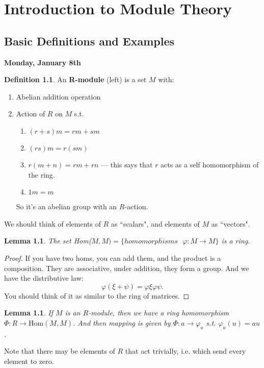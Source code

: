 \documentclass[12pt]{amsbook}
\theoremstyle{plain}
\numberwithin{section}{chapter}
\numberwithin{equation}{chapter}
\newtheorem{lem}[theorem]{Lemma}
\theoremstyle{definition}
\newtheorem{Def}[theorem]{Definition}
\theoremstyle{remark}
\renewcommand{\phi}{\varphi}
\begin{document}
\chapter{Introduction to Module Theory}
\section{Basic Definitions and Examples}

\textbf{Monday, January 8th}
\begin{Def}
An \textbf{R-module} (left) is a set $M$ with: 
\begin{enumerate}
\item Abelian addition operation
\item Action of $R$ on $M$ s.t. 
\begin{enumerate}
\item $(r + s)m = rm + sm$ 
\item $(rs)m = r(sm)$
\item $r(m + n) = rm + rn$ --- this says that $r$ acts as a self homomorphism of the ring. 
\item $1m = m$
\end{enumerate}
So it's an abelian group with an $R$-action. 
\end{enumerate}
\end{Def}

We should think of elements of $R$ as ``scalars", and elements of $M$ as ``vectors".

\begin{lem}
The set Hom($M,M) = \{homomorphisms \text{ } \phi:M \to M\}$ is a ring. 
\end{lem} 

\begin{proof}
If you have two homs, you can add them, and the product is a composition. They are associative, under addition, they form a group. And we have the distributive law: 
$$
\phi(\xi + \psi) = \phi\xi \phi\psi.
$$
You should think of it as similar to the ring of matrices. 
\end{proof}


\begin{lem}
If $M$ is an $R$-module, then we have a ring homomorphism $\Phi: R \to \text{Hom}(M,M)$. And then mapping is given by $\Phi: a \to \phi_a$ s.t. $\phi_a(u) = au$. 
\end{lem} 

Note that there may be elements of $R$ that act trivially, i.e. which send every element to zero. 
\end{document}
